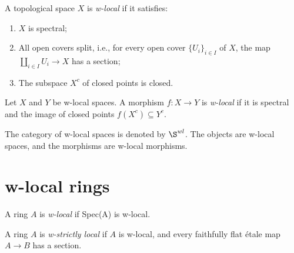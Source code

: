 \begin{definition}
    A topological space \(X\) is \emph{w-local} if it satisfies:
    \begin{enumerate}
        \item \(X\) is spectral;
        \item All open covers split, i.e., for every open cover \(\{U_i\}_{i \in I}\) of \(X\), the map \(\coprod_{i \in I} U_i \to X\) has a section;
        \item The subspace \(X^c\) of closed points is closed.
    \end{enumerate}
    \label{def:w-local-space}
\end{definition}

\begin{definition}
    Let \(X\) and \(Y\) be w-local spaces. A morphism \(f: X \to Y\) is \emph{w-local} if it is spectral and the image of closed points \(f(X^c) \subseteq Y^c\).
    \label{def:w-local-morphism}
\end{definition}

\begin{definition}
    The category of w-local spaces is denoted by \(\S^{wl}\). The objects are w-local spaces, and the morphisms are w-local morphisms.
    \label{def:w-local-space-category}
\end{definition}



\section{w-local rings}

\begin{definition}
    A ring \(A\) is \emph{w-local} if Spec(A) is w-local.
    \label{def:w-local-ring}
\end{definition}

\begin{definition}
    A ring \(A\) is \emph{w-strictly local} if \(A\) is w-local, and every faithfully flat \'etale map \(A \to B\) has a section.
    \label{def:w-strictly-local-ring}
\end{definition}


